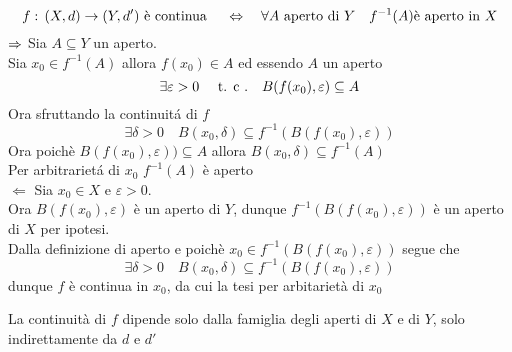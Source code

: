 \begin{thm}
$$ f:\, (X,d) \to (Y,d') \text{ \`e continua } \quad \Leftrightarrow \quad \forall A \text{ aperto di } Y \quad f^{-1}(A) \text{\`e aperto in } X $$
\proof $\Rightarrow$ Sia $A\subseteq Y$ un aperto.\\
Sia $x_0 \in f^{-1}(A)$ allora  $f(x_0)\in A$ ed essendo $A$ un aperto 
$$ \exists \varepsilon >0 \quad \text{ t. c .} \quad B(f(x_0),\varepsilon) \subseteq A $$
Ora sfruttando la continuit\'a di $f$ 
$$ \exists \delta>0 \quad B(x_0,\delta)\subseteq f^{-1}(B(f(x_0), \varepsilon))$$
Ora poich\`e 
$B(f(x_0), \varepsilon)) \subseteq A $ allora $B(x_0,\delta) \subseteq f^{-1}(A)$\\
Per arbitrariet\'a di $x_0$ $f^{-1}(A)$ \`e aperto\\
$\Leftarrow$
Sia $x_0\in X$ e $\varepsilon>0$.\\
Ora $B(f(x_0), \varepsilon)$ \`e un aperto di $Y$, dunque $ f^{-1}(B(f(x_0),\varepsilon)) $ \`e un aperto di $X$ per ipotesi.\\
Dalla definizione di aperto  e poich\`e  $x_0 \in f^{-1}(B(f(x_0),\varepsilon))$  segue che
$$ \exists \delta >0 \quad B(x_0, \delta) \subseteq f^{-1}(B(f(x_0),\varepsilon))$$
dunque $f$ \`e continua in $x_0$, da cui la tesi per arbitariet\`a di $x_0$
\endproof
\begin{oss}
La continuit\`a di $f$ dipende solo dalla famiglia degli aperti di $X$ e di $Y$, solo indirettamente da $d$ e $d'$
\end{oss}
\end{thm}
